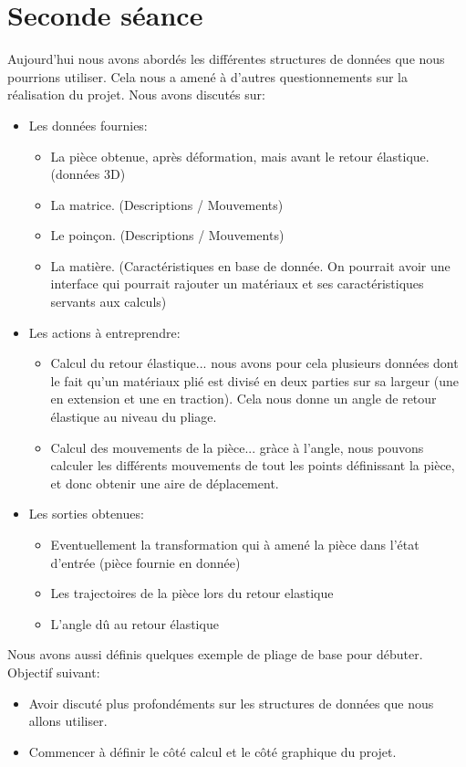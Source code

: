 \section{Seconde séance}

Aujourd'hui nous avons abordés les différentes structures de données que nous pourrions utiliser.
Cela nous a amené à d'autres questionnements sur la réalisation du projet.
Nous avons discutés sur:
\begin{itemize}
    \item Les données fournies:
        \begin{itemize}
            \item La pièce obtenue, après déformation, mais avant le retour élastique. (données 3D)
            \item La matrice. (Descriptions / Mouvements)
            \item Le poinçon. (Descriptions / Mouvements)
            \item La matière. (Caractéristiques en base de donnée. On pourrait avoir une interface qui pourrait rajouter un matériaux et ses caractéristiques servants aux calculs)
        \end{itemize}
        \item Les actions à entreprendre:
        \begin{itemize}
            \item Calcul du retour élastique... nous avons pour cela plusieurs données dont le fait qu'un matériaux plié est divisé en deux parties sur sa largeur (une en extension et une en traction). Cela nous donne un angle de retour élastique au niveau du pliage.
            \item Calcul des mouvements de la pièce... gràce à l'angle, nous pouvons calculer les différents mouvements de tout les points définissant la pièce, et donc obtenir une aire de déplacement.
        \end{itemize}
        \item Les sorties obtenues:
        \begin{itemize}
            \item Eventuellement la transformation qui à amené la pièce dans l'état d'entrée (pièce fournie en donnée)
            \item Les trajectoires de la pièce lors du retour elastique
            \item L'angle dû au retour élastique
        \end{itemize}
\end{itemize}

Nous avons aussi définis quelques exemple de pliage de base pour débuter.\\

Objectif suivant:
\begin{itemize}
        \item Avoir discuté plus profondéments sur les structures de données que nous allons utiliser.
        \item Commencer à définir le côté calcul et le côté graphique du projet.
\end{itemize}

